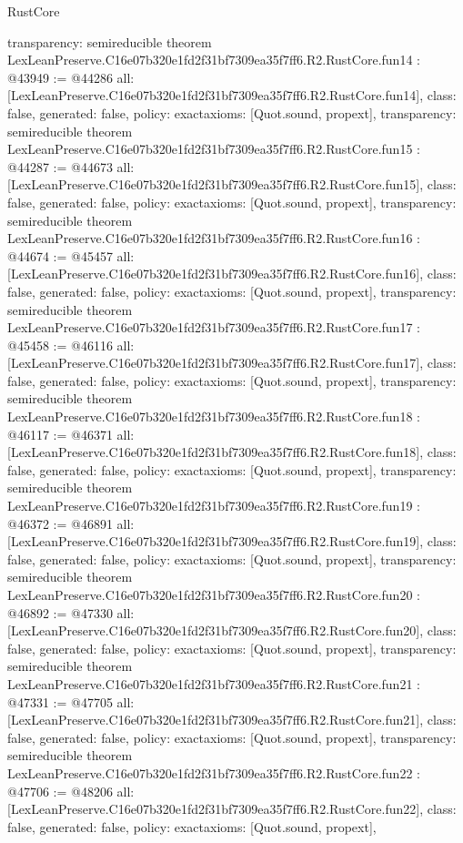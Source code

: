 \begin{lexlean}{RustCore}
\begin{coremodule}
{  transparency: semireducible
}
theorem LexLeanPreserve.C16e07b320e1fd2f31bf7309ea35f7ff6.R2.RustCore.fun14 : @43949 := @44286 {
  all: [LexLeanPreserve.C16e07b320e1fd2f31bf7309ea35f7ff6.R2.RustCore.fun14],
  class: false,
  generated: false,
  policy: exact{axioms: [Quot.sound, propext]},
  transparency: semireducible
}
theorem LexLeanPreserve.C16e07b320e1fd2f31bf7309ea35f7ff6.R2.RustCore.fun15 : @44287 := @44673 {
  all: [LexLeanPreserve.C16e07b320e1fd2f31bf7309ea35f7ff6.R2.RustCore.fun15],
  class: false,
  generated: false,
  policy: exact{axioms: [Quot.sound, propext]},
  transparency: semireducible
}
theorem LexLeanPreserve.C16e07b320e1fd2f31bf7309ea35f7ff6.R2.RustCore.fun16 : @44674 := @45457 {
  all: [LexLeanPreserve.C16e07b320e1fd2f31bf7309ea35f7ff6.R2.RustCore.fun16],
  class: false,
  generated: false,
  policy: exact{axioms: [Quot.sound, propext]},
  transparency: semireducible
}
theorem LexLeanPreserve.C16e07b320e1fd2f31bf7309ea35f7ff6.R2.RustCore.fun17 : @45458 := @46116 {
  all: [LexLeanPreserve.C16e07b320e1fd2f31bf7309ea35f7ff6.R2.RustCore.fun17],
  class: false,
  generated: false,
  policy: exact{axioms: [Quot.sound, propext]},
  transparency: semireducible
}
theorem LexLeanPreserve.C16e07b320e1fd2f31bf7309ea35f7ff6.R2.RustCore.fun18 : @46117 := @46371 {
  all: [LexLeanPreserve.C16e07b320e1fd2f31bf7309ea35f7ff6.R2.RustCore.fun18],
  class: false,
  generated: false,
  policy: exact{axioms: [Quot.sound, propext]},
  transparency: semireducible
}
theorem LexLeanPreserve.C16e07b320e1fd2f31bf7309ea35f7ff6.R2.RustCore.fun19 : @46372 := @46891 {
  all: [LexLeanPreserve.C16e07b320e1fd2f31bf7309ea35f7ff6.R2.RustCore.fun19],
  class: false,
  generated: false,
  policy: exact{axioms: [Quot.sound, propext]},
  transparency: semireducible
}
theorem LexLeanPreserve.C16e07b320e1fd2f31bf7309ea35f7ff6.R2.RustCore.fun20 : @46892 := @47330 {
  all: [LexLeanPreserve.C16e07b320e1fd2f31bf7309ea35f7ff6.R2.RustCore.fun20],
  class: false,
  generated: false,
  policy: exact{axioms: [Quot.sound, propext]},
  transparency: semireducible
}
theorem LexLeanPreserve.C16e07b320e1fd2f31bf7309ea35f7ff6.R2.RustCore.fun21 : @47331 := @47705 {
  all: [LexLeanPreserve.C16e07b320e1fd2f31bf7309ea35f7ff6.R2.RustCore.fun21],
  class: false,
  generated: false,
  policy: exact{axioms: [Quot.sound, propext]},
  transparency: semireducible
}
theorem LexLeanPreserve.C16e07b320e1fd2f31bf7309ea35f7ff6.R2.RustCore.fun22 : @47706 := @48206 {
  all: [LexLeanPreserve.C16e07b320e1fd2f31bf7309ea35f7ff6.R2.RustCore.fun22],
  class: false,
  generated: false,
  policy: exact{axioms: [Quot.sound, propext]},
}
\end{coremodule}
\end{lexlean}
